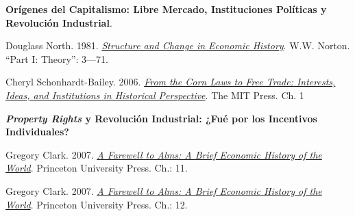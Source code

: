 \documentclass[letterpaper]{article}
\renewenvironment{itemize}{
  \begin{list}{}{
    \setlength{\leftmargin}{1.5em}
  }
}{
  \end{list}
}
\begin{document}
\begin{enumerate}[label=\roman*.]
	\item {}
		\begin{itemize}

			\item[11.] {\bf Or\'igenes del Capitalismo: Libre Mercado, Instituciones Pol\'iticas y Revoluci\'on Industrial}.
				\begin{itemize}

         \item[$\circ$]  Douglass North. 1981. \href{https://github.com/hbahamonde/Ciencia_Politica_II/raw/master/Readings/North_1982.pdf}{\emph{Structure and Change in Economic History}}. W.W. Norton. ``Part I: Theory'': 3---71.
         			
         \item[$\circ$] Cheryl Schonhardt-Bailey. 2006. \href{https://github.com/hbahamonde/Ciencia_Politica_II/raw/master/Readings/Corn_Laws.pdf}{\emph{From the Corn Laws to Free Trade: Interests, Ideas, and Institutions in Historical Perspective}}. The MIT Press. Ch. 1
        \end{itemize}


			\item[12.] {\bf \emph{Property Rights} y Revoluci\'on Industrial: ¿Fu\'e por los Incentivos Individuales?}

				\begin{itemize} 
					\item[$\circ$]  Gregory Clark. 2007. \href{https://github.com/hbahamonde/Ciencia_Politica_II/raw/master/Readings/Clark.pdf}{\emph{A Farewell to Alms: A Brief Economic History of the World}}. Princeton University Press. Ch.: 11.
					\item[$\circ$]  Gregory Clark. 2007. \href{https://github.com/hbahamonde/Ciencia_Politica_II/raw/master/Readings/Clark.pdf}{\emph{A Farewell to Alms: A Brief Economic History of the World}}. Princeton University Press. Ch.: 12.
				\end{itemize}



\end{itemize}
\end{enumerate}
\end{document}
